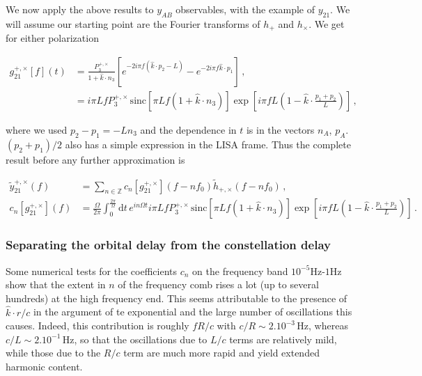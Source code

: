 \documentclass[aps,showpacs,twocolumn,prd,superscriptaddress,nofootinbib]{revtex4}
\newcommand\ud{{\mathrm{d}}}
\newcommand{\nn}{\nonumber}
\newcommand{\hatk}{\hat{k}}
\newcommand{\Hz}{\,\mathrm{Hz}}
\newcommand{\sinc}{\,\mathrm{sinc}}
\begin{document}
We now apply the above results to $y_{AB}$ observables, with the example of $y_{21}$. We will assume our starting point are the Fourier transforms of $h_{+}$ and $h_{\times}$. We get for either polarization
%
\begin{widetext}
\begin{align}
	g_{21}^{+,\times}[f](t) &= \frac{P_{3}^{+,\times}}{1+\hatk\cdot n_{3}} \left[ e^{-2i\pi f (\hatk\cdot p_{2} - L)} - e^{-2i\pi f \hatk\cdot p_{1}} \right] \,, \nn\\
	&= i\pi L f P_{3}^{+,\times} \sinc\left[ \pi L f(1+\hatk \cdot n_{3})\right]\exp\left[ i \pi f L \left(  1 - \hatk \cdot \frac{p_{1}+p_{2}}{L}\right) \right] \,,
\end{align}
\end{widetext}
%
where we used $p_{2}-p_{1} = -L n_{3}$ and the dependence in $t$ is in the vectors $n_{A}$, $p_{A}$. $(p_{2}+p_{1})/2 $ also has a simple expression in the LISA frame. Thus the complete result before any further approximation is
%
\begin{widetext}
\begin{subequations}
\begin{align}
	\tilde{y}_{21}^{+,\times}(f) &= \sum\limits_{n\in \mathbb{Z}} c_{n}[g_{21}^{+,\times}]\left(f - n f_{0}\right) \tilde{h}_{+,\times}\left(f - n f_{0}\right)\,, \\
	c_{n}[g_{21}^{+,\times}]\left(f\right) &= \frac{\Omega}{2\pi}\int_{0}^{\frac{2\pi}{\Omega}} \ud t \, e^{i n \Omega t} i\pi L f P_{3}^{+,\times} \sinc\left[ \pi L f(1+\hatk \cdot n_{3})\right]\exp\left[ i \pi f L \left(  1 - \hatk \cdot \frac{p_{1}+p_{2}}{L}\right) \right]  \,.
\end{align}
\end{subequations}
\end{widetext}
%


\subsubsection*{Separating the orbital delay from the constellation delay}

Some numerical tests for the coefficients $c_{n}$ on the frequency band $10^{-5}$Hz-$1$Hz show that the extent in $n$ of the frequency comb rises a lot (up to several hundreds) at the high frequency end. This seems attributable to the presence of $\hatk\cdot r/c$ in the argument of te exponential and the large number of oscillations this causes. Indeed, this contribution is roughly $f R/c$ with $c/R\sim 2.10^{-3}\Hz$, whereas $c/L\sim 2.10^{-1}\Hz$, so that the oscillations due to $L/c$ terms are relatively mild, while those due to the $R/c$ term are much more rapid and yield extended harmonic content.
\end{document}

